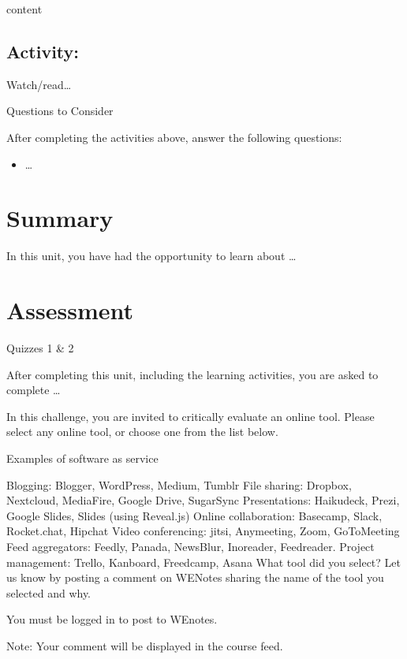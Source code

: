 \documentclass[
]{book}
\providecommand{\tightlist}{%
  \setlength{\itemsep}{0pt}\setlength{\parskip}{0pt}}
\theoremstyle{definition}
\theoremstyle{definition}
\theoremstyle{definition}
\theoremstyle{definition}
\theoremstyle{remark}
\begin{document}
content

\hypertarget{activity-11}{%
\subsection*{Activity:}\label{activity-11}}

\begin{reflect}
Watch/read\ldots{}

{Questions to Consider}

After completing the activities above, answer the following questions:

\begin{itemize}
\tightlist
\item
  \ldots{}
\end{itemize}
\end{reflect}

\hypertarget{summary-3}{%
\section*{Summary}\label{summary-3}}

In this unit, you have had the opportunity to learn about \ldots{}

\hypertarget{assessment-3}{%
\section*{Assessment}\label{assessment-3}}

\begin{assessment}
{Quizzes 1 \& 2}

After completing this unit, including the learning activities, you are asked to complete \ldots{}

In this challenge, you are invited to critically evaluate an online tool. Please select any online tool, or choose one from the list below.

Examples of software as service

Blogging: Blogger, WordPress, Medium, Tumblr
File sharing: Dropbox, Nextcloud, MediaFire, Google Drive, SugarSync
Presentations: Haikudeck, Prezi, Google Slides, Slides (using Reveal.js)
Online collaboration: Basecamp, Slack, Rocket.chat, Hipchat
Video conferencing: jitsi, Anymeeting, Zoom, GoToMeeting
Feed aggregators: Feedly, Panada, NewsBlur, Inoreader, Feedreader.
Project management: Trello, Kanboard, Freedcamp, Asana
What tool did you select? Let us know by posting a comment on WENotes sharing the name of the tool you selected and why.

You must be logged in to post to WEnotes.

Note: Your comment will be displayed in the course feed.
\end{assessment}
\end{document}
